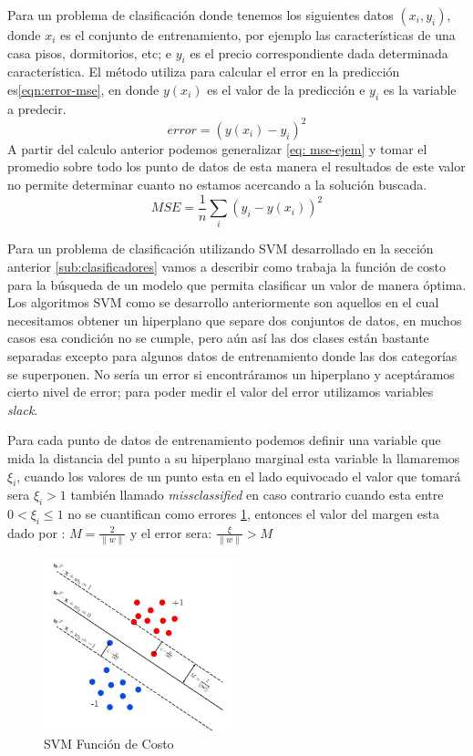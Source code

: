 Para un problema de clasificación donde tenemos los siguientes datos $(x_i,y_i) $, donde $x_i $ es el conjunto de entrenamiento, por ejemplo las características de una casa pisos, dormitorios, etc; e $y_i$ es el precio correspondiente dada determinada característica. El método utiliza para calcular el error en la predicción es\ref{eqn:error-mse}, en donde $ y(x_i)$ es el valor de la predicción e $y_i$ es la variable a predecir.
\begin{equation}\label{eqn:error-mse}
error = (y(x_i) - y_i)^2
\end{equation} 
A partir del calculo anterior podemos generalizar \ref{eq: mse-ejem} y tomar el promedio sobre todo los punto de datos de esta manera el resultados de este valor no permite determinar cuanto no estamos acercando a la solución buscada.
\begin{equation}\label{eq: mse-ejem}
MSE =  \frac{1}{n}\sum_{i}(y_i - y(x_i))^2
\end{equation}

Para un problema de clasificación utilizando  SVM desarrollado en la sección anterior \ref{sub:clasificadores} vamos a describir como trabaja la función de costo para la búsqueda  de un modelo que permita clasificar un valor de manera óptima. Los algoritmos SVM como se desarrollo anteriormente son aquellos en el cual necesitamos obtener un hiperplano que separe  dos conjuntos de datos, en  muchos casos esa condición no se cumple, pero aún así las dos clases están bastante separadas excepto para algunos datos de entrenamiento  donde las dos categorías se superponen. No sería un error si encontráramos un hiperplano y aceptáramos cierto nivel de error; para poder medir el valor del error  utilizamos variables \textit{slack}.

Para cada punto de datos de entrenamiento podemos definir una variable que mida la distancia del punto a su hiperplano marginal  esta variable la llamaremos  $\xi _i$, cuando los valores de un punto esta en el lado equivocado el valor que tomará sera $ \xi_i > 1$ también llamado \textit{missclassified} en caso contrario cuando esta entre $ 0 < \xi_i \leq 1 $ no se cuantifican como errores \ref{Fig:slack-var}, entonces el valor del  margen esta dado por : $ M  = \frac{2}{ \|w \|} $  y el error sera:  $ \frac{ \xi}{ \|w \|} >  M$
\begin{figure}[H] \centering
  \includegraphics[height=5cm,keepaspectratio=true,clip=true]{imagenes/MarcoTeorico/slack-var.png}
  \caption{SVM  Función de Costo }\label{Fig:slack-var}
\end{figure}

